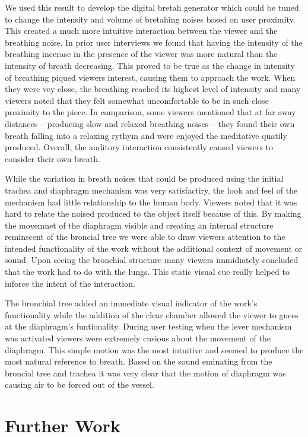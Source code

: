 \documentclass[letterpaper]{article}
\begin{document}
We used this result to develop the digital bretah generator which could be tuned to change the intensity and volume of bretahing noises based on user proximity. This created a much more intuitive interaction between the viewer and the breathing noise. In prior user interviews we found that having the intensity of the breathing incerase in the presence of the viewer was more natural than the intensity of breath decreasing. This proved to be true as the change in intensity of breathing piqued viewers interest, causing them to approach the work. When they were vey close, the breathing reached its highest level of intensity and many viewers noted that they felt somewhat uncomfortable to be in such close proximity to the piece. In comparison, some viewers mentioned that at far away distances -- producing slow and relaxed breathing noises -- they found their own breath falling into a relaxing rythym and were enjoyed the meditative quatily produced. Overall, the auditory interaction consistently caused viewers to consider their own breath. 


While the variation in breath noises that could be produced using the initial trachea and diaphragm mechanism was very satisfactiry, the look and feel of the mechanism had little relationship to the human body. Viewers noted that it was hard to relate the noised produced to the object itself because of this. By making the movemnet of the diaphragm visible and creating an internal structure reminscent of the broncial tree we were able to draw viewers attention to the intended functionality of the work without the additional context of movement or sound. Upon seeing the bronchial structure many viewers immidiately concluded that the work had to do with the lungs. This static visual cue really helped to inforce the intent of the interaction.

The bronchial tree added an immediate visual indicator of the work's functionality while the addition of the clear chamber allowed the viewer to guess at the diaphragm's funtionality. During user testing when the lever mechanism was activated viewers were extremely cusious about the movement of the diaphragm. This simple motion was the most intuitive and seemed to produce the most natural reference to breath. Based on the sound eminating from the broncial tree and trachea it was very clear that the motion of diaphragm was causing air to be forced out of the vessel. 

\section{Further Work}
\end{document}
